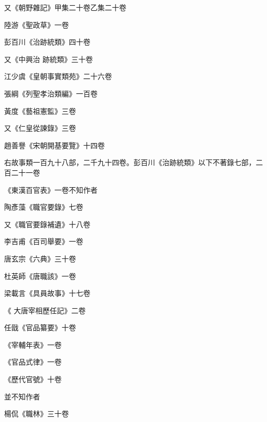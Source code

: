 \begin{pinyinscope}
 又《朝野雜記》甲集二十卷乙集二十卷



 陸游《聖政草》一卷



 彭百川《治跡統類》四十卷



 又《中興治
 跡統類》三十卷



 江少虞《皇朝事實類苑》二十六卷



 張綱《列聖孝治類編》一百卷



 黃度《藝祖憲監》三卷



 又《仁皇從諫錄》三卷



 趙善譽《宋朝開基要覽》十四卷



 右故事類一百九十八部，二千九十四卷。彭百川《治跡統類》以下不著錄七部，二百二十一卷



 《東漢百官表》一卷不知作者



 陶彥藻《職官要錄》七卷



 又《職官要錄補遺》十八卷



 李吉甫《百司舉要》一卷



 唐玄宗《六典》三十卷



 杜英師《唐職該》一卷



 梁載言《具員故事》十七卷



 《
 大唐宰相歷任記》二卷



 任戩《官品纂要》十卷



 《宰輔年表》一卷



 《官品式律》一卷



 《歷代官號》十卷



 並不知作者



 楊侃《職林》三十卷




\end{pinyinscope}
